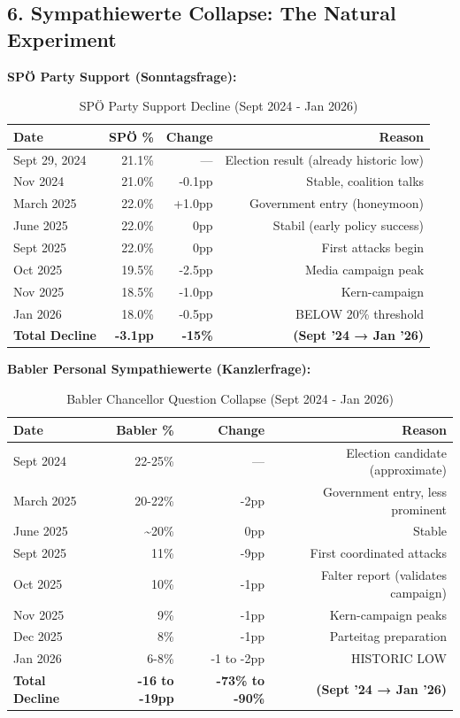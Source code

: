\subsection*{6. Sympathiewerte Collapse: The Natural Experiment}

\textbf{SPÖ Party Support (Sonntagsfrage):}

\begin{table}[h]
\centering
\caption{SPÖ Party Support Decline (Sept 2024 - Jan 2026)}
\label{tab:dx-spo-decline}
\begin{tabular}{|l|r|r|r|}
\hline
\textbf{Date} & \textbf{SPÖ \%} & \textbf{Change} & \textbf{Reason} \\
\hline
Sept 29, 2024 & 21.1\% & — & Election result (already historic low) \\
Nov 2024 & 21.0\% & -0.1pp & Stable, coalition talks \\
March 2025 & 22.0\% & +1.0pp & Government entry (honeymoon) \\
June 2025 & 22.0\% & 0pp & Stabil (early policy success) \\
Sept 2025 & 22.0\% & 0pp & First attacks begin \\
Oct 2025 & 19.5\% & -2.5pp & Media campaign peak \\
Nov 2025 & 18.5\% & -1.0pp & Kern-campaign \\
Jan 2026 & 18.0\% & -0.5pp & BELOW 20\% threshold \\
\hline
\textbf{Total Decline} & \textbf{-3.1pp} & \textbf{-15\%} & \textbf{(Sept '24 → Jan '26)} \\
\hline
\end{tabular}
\end{table}

\textbf{Babler Personal Sympathiewerte (Kanzlerfrage):}

\begin{table}[h]
\centering
\caption{Babler Chancellor Question Collapse (Sept 2024 - Jan 2026)}
\label{tab:dx-babler-collapse}
\begin{tabular}{|l|r|r|r|}
\hline
\textbf{Date} & \textbf{Babler \%} & \textbf{Change} & \textbf{Reason} \\
\hline
Sept 2024 & 22-25\% & — & Election candidate (approximate) \\
March 2025 & 20-22\% & -2pp & Government entry, less prominent \\
June 2025 & \sim 20\% & ~0pp & Stable \\
Sept 2025 & 11\% & -9pp & First coordinated attacks \\
Oct 2025 & 10\% & -1pp & Falter report (validates campaign) \\
Nov 2025 & 9\% & -1pp & Kern-campaign peaks \\
Dec 2025 & 8\% & -1pp & Parteitag preparation \\
Jan 2026 & 6-8\% & -1 to -2pp & HISTORIC LOW \\
\hline
\textbf{Total Decline} & \textbf{-16 to -19pp} & \textbf{-73\% to -90\%} & \textbf{(Sept '24 → Jan '26)} \\
\hline
\end{tabular}
\end{table}

